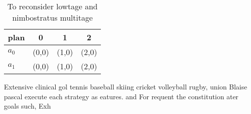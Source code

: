 \documentclass[a4paper]{article}
\begin{document}
\begin{table}
\begin{adjustbox}{width=0.5\columnwidth}
\begin{tabular}{|l|l|l|l|}
\hline
\textbf{plan} & \multicolumn{1}{c|}{\textbf{0}} & \multicolumn{1}{c|}{\textbf{1}} & \multicolumn{1}{c|}{\textbf{2}} \\ \hline
\textbf{$a_0$}  & (0,0) & (1,0) & (2,0) \\ \hline
\textbf{$a_1$}  & (0,0) & (1,0) & (2,0) \\ \hline
\end{tabular}
\end{adjustbox}
\caption{To reconsider lowtage and nimbostratus multitage 
}
\end{table}

Extensive clinical gol tennis baseball skiing cricket volleyball rugby, union Blaise pascal execute each strategy as eatures. and For requent the constitution ater goals such, Exh
\end{document}
